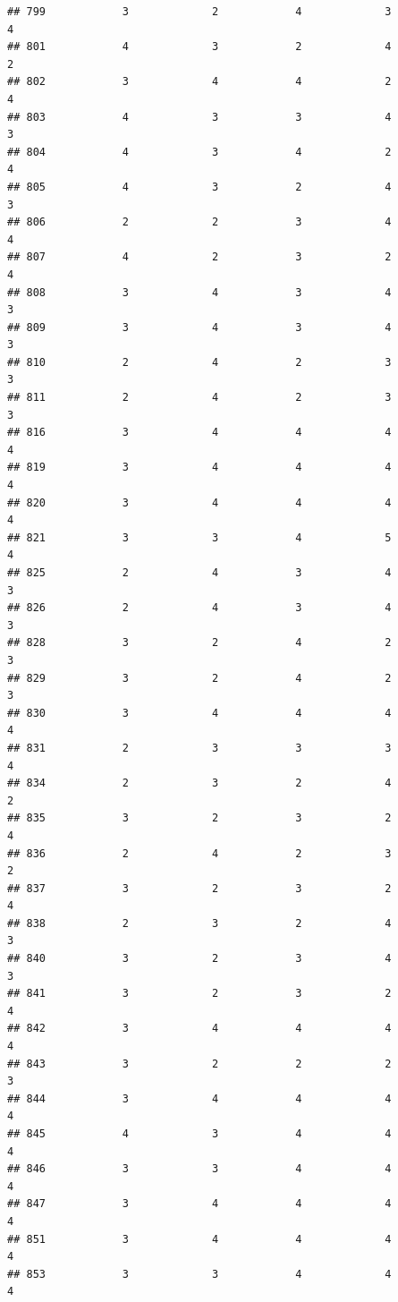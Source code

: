 \documentclass[
]{article}
\begin{document}
\begin{verbatim}
## 799            3             2            4             3          4
## 801            4             3            2             4          2
## 802            3             4            4             2          4
## 803            4             3            3             4          3
## 804            4             3            4             2          4
## 805            4             3            2             4          3
## 806            2             2            3             4          4
## 807            4             2            3             2          4
## 808            3             4            3             4          3
## 809            3             4            3             4          3
## 810            2             4            2             3          3
## 811            2             4            2             3          3
## 816            3             4            4             4          4
## 819            3             4            4             4          4
## 820            3             4            4             4          4
## 821            3             3            4             5          4
## 825            2             4            3             4          3
## 826            2             4            3             4          3
## 828            3             2            4             2          3
## 829            3             2            4             2          3
## 830            3             4            4             4          4
## 831            2             3            3             3          4
## 834            2             3            2             4          2
## 835            3             2            3             2          4
## 836            2             4            2             3          2
## 837            3             2            3             2          4
## 838            2             3            2             4          3
## 840            3             2            3             4          3
## 841            3             2            3             2          4
## 842            3             4            4             4          4
## 843            3             2            2             2          3
## 844            3             4            4             4          4
## 845            4             3            4             4          4
## 846            3             3            4             4          4
## 847            3             4            4             4          4
## 851            3             4            4             4          4
## 853            3             3            4             4          4

\end{verbatim}
\end{document}

